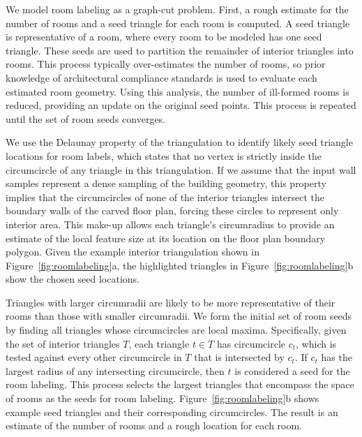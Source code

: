 \documentclass[12pt,onecolumn,oneside]{book}
\begin{document}
We model room labeling as a graph-cut problem.  First, a rough estimate for the number of rooms and a seed triangle for each room is computed.  A seed triangle is representative of a room, where every room to be modeled has one seed triangle.  These seeds are used to partition the remainder of interior triangles into rooms.  This process typically over-estimates the number of rooms, so prior knowledge of architectural compliance standards is used to evaluate each estimated room geometry.  Using this analysis, the number of ill-formed rooms is reduced, providing an update on the original seed points.  This process is repeated until the set of room seeds converges.


We use the Delaunay property of the triangulation to identify likely seed triangle locations for room labels, which states that no vertex is strictly inside the circumcircle of any triangle in this triangulation.  If we assume that the input wall samples represent a dense sampling of the building geometry, this property implies that the circumcircles of none of the interior triangles intersect the boundary walls of the carved floor plan, forcing these circles to represent only interior area.  This make-up allows each triangle's circumradius to provide an estimate of the local feature size at its location on the floor plan boundary polygon.  Given the example interior triangulation shown in Figure~\ref{fig:roomlabeling}a, the highlighted triangles in Figure~\ref{fig:roomlabeling}b show the chosen seed locations.

Triangles with larger circumradii are likely to be more representative of their rooms than those with smaller circumradii.  We form the initial set of room seeds by finding all triangles whose circumcircles are local maxima.  Specifically, given the set of interior triangles $T$, each triangle $t \in T$ has circumcircle $c_t$, which is tested against every other circumcircle in $T$ that is intersected by $c_t$.  If $c_t$ has the largest radius of any intersecting circumcircle, then $t$ is considered a seed for the room labeling.  This process selects the largest triangles that encompass the space of rooms as the seeds for room labeling.  Figure~\ref{fig:roomlabeling}b shows example seed triangles and their corresponding circumcircles.  The result is an estimate of the number of rooms and a rough location for each room.
\end{document}
